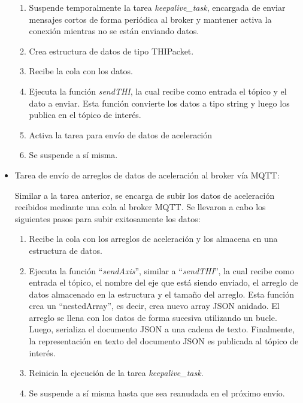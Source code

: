 \begin{itemize}
    \begin{enumerate}
        \item Suspende temporalmente la tarea \textit{keepalive\_task}, encargada de enviar mensajes cortos de forma periódica al broker y mantener activa la conexión mientras no se están enviando datos.
        \item Crea estructura de datos de tipo THIPacket.
        \item Recibe la cola con los datos.
        \item Ejecuta la función \textit{sendTHI}, la cual recibe como entrada el tópico y el dato a enviar. Esta función convierte los datos a tipo string y luego los publica en el tópico de interés.
        \item Activa la tarea para envío de datos de aceleración
        \item Se suspende a sí misma.
    \end{enumerate}
    
    \item Tarea de envío de arreglos de datos de aceleración al broker vía MQTT:
    
    Similar a la tarea anterior, se encarga de subir los datos de aceleración recibidos mediante una cola al broker MQTT. Se llevaron a cabo los siguientes pasos para subir exitosamente los datos:

    \begin{enumerate}
        \item Recibe la cola con los arreglos de aceleración y los almacena en una estructura de datos.
        \item Ejecuta la función ``\textit{sendAxis}'', similar a ``\textit{sendTHI}'', la cual recibe como entrada el tópico, el nombre del eje que está siendo enviado, el arreglo de datos almacenado en la estructura y el tamaño del arreglo. Esta función crea un ``nestedArray'', es decir, crea nuevo array JSON anidado. El arreglo se llena con los datos de forma sucesiva utilizando un bucle. Luego, serializa el documento JSON a una cadena de texto. Finalmente, la representación en texto del documento JSON es publicada al tópico de interés.
        \item Reinicia la ejecución de la tarea \textit{keepalive\_task}.
        \item Se suspende a sí misma hasta que sea reanudada en el próximo envío.
    \end{enumerate}
    
\end{itemize}

